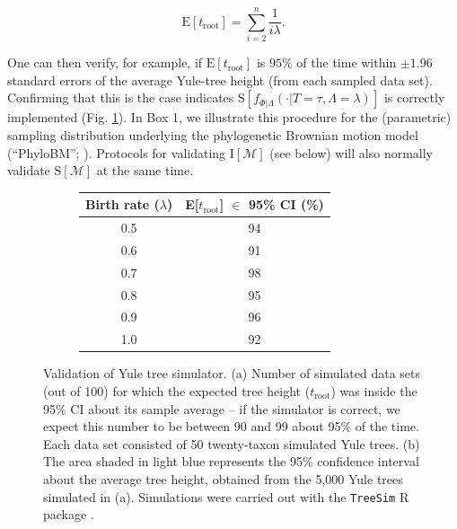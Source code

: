 \documentclass[oneside]{article}
\begin{document}
\begin{equation}
  \text{E}[t_{\text{root}}] = \sum_{i=2}^{n}\frac{1}{i\lambda}.
  \label{eq:yule}
\end{equation}

\noindent One can then verify, for example, if $\text{E}[t_{\text{root}}]$ is $95\%$ of the time within $\pm 1.96$ standard errors of the average Yule-tree height (from each sampled data set).
Confirming that this is the case indicates $\text{S}[f_{\Phi|\Lambda}(\cdot|T=\tau,\Lambda=\lambda)]$ is correctly implemented (Fig. \ref{fig:yulemean}).
In Box 1, we illustrate this procedure for the (parametric) sampling distribution underlying the phylogenetic Brownian motion model (``PhyloBM''; \citealp{fel73}).
Protocols for validating $\text{I}[\mathcal{M}]$ (see below) will also normally validate $\text{S}[\mathcal{M}]$ at the same time.

\begin{figure}
  \centering
  \vspace{0pt}
  \begin{subfigure}[t]{0.5\textwidth}
    \caption{}
    \centering
    \begin{tabular}{ cc }
    \hline
    Birth rate ($\lambda$) & E[$t_{\text{root}}$] $\in$ 95\% CI (\%)\\
    \hline  
    \rowcolor{gray!10}0.5 & 94\\
    0.6 & 91\\
    \rowcolor{gray!10}0.7 & 98\\
    0.8 & 95\\
    \rowcolor{gray!10}0.9 & 96\\
    1.0 & 92
  \end{tabular}
  \end{subfigure}
  \vspace{0pt}
  \hspace{1cm}
  \begin{subfigure}[t]{0.4\textwidth}
    \caption{}
    \centering
        
  \end{subfigure}
  \hfill
  \caption{Validation of Yule tree simulator.
    (a) Number of simulated data sets (out of 100) for which the
    expected tree height ($t_{\text{root}}$) was inside the 95\% CI
    about its sample average -- if the simulator is correct, we expect
    this number to be between 90 and 99 about 95\% of the time.
    Each data set consisted of 50 twenty-taxon simulated Yule trees.
    (b) The area shaded in light blue represents the
    95\% confidence interval about the average tree height, obtained
    from the 5,000 Yule trees simulated in (a). Simulations were
    carried out with the \texttt{TreeSim} R package \citep{stadler11}.}
  \label{fig:yulemean}
\end{figure}
\end{document}
